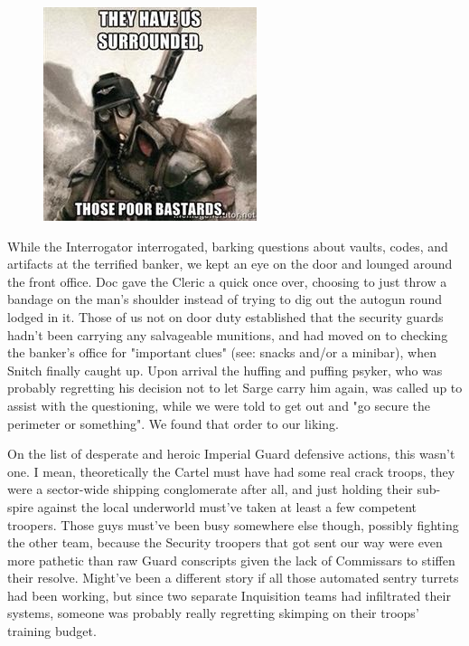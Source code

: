\begin{figure}
	\begin{center}
		\includegraphics[width=\figwidth]{pics/18/29.png}
	\end{center}
\end{figure}
While the Interrogator interrogated, barking questions about vaults, codes, and artifacts at the terrified banker, we kept an eye on the door and lounged around the front office. 
Doc gave the Cleric a quick once over, choosing to just throw a bandage on the man's shoulder instead of trying to dig out the autogun round lodged in it. 
Those of us not on door duty established that the security guards hadn't been carrying any salvageable munitions, and had moved on to checking the banker's office for "important clues" (see: 
snacks and/or a minibar), when Snitch finally caught up. 
Upon arrival the huffing and puffing psyker, who was probably regretting his decision not to let Sarge carry him again, was called up to assist with the questioning, while we were told to get out and "go secure the perimeter or something". 
We found that order to our liking.

On the list of desperate and heroic Imperial Guard defensive actions, this wasn't one. 
I mean, theoretically the Cartel must have had some real crack troops, they were a sector-wide shipping conglomerate after all, and just holding their sub-spire against the local underworld must've taken at least a few competent troopers. 
Those guys must've been busy somewhere else though, possibly fighting the other team, because the Security troopers that got sent our way were even more pathetic than raw Guard conscripts given the lack of Commissars to stiffen their resolve. 
Might've been a different story if all those automated sentry turrets had been working, but since two separate Inquisition teams had infiltrated their systems, someone was probably really regretting skimping on their troops' training budget.

